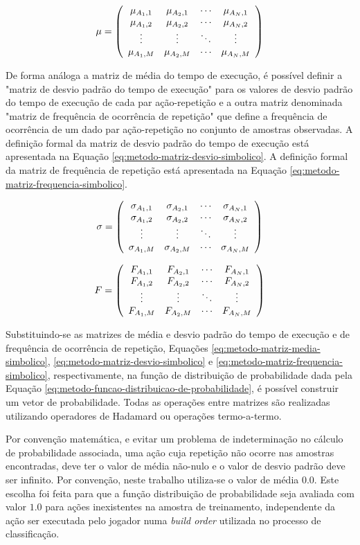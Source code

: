 \begin{equation}
	\mu =  \left(\begin{array}{cccc} {\mu}_{A_1,1} & {\mu}_{A_2,1} & \cdots & {\mu}_{A_N,1} \\ {\mu}_{A_1,2} & {\mu}_{A_2,2} & \cdots & {\mu}_{A_N,2} \\ \vdots & \vdots & \ddots & \vdots \\ {\mu}_{A_1,M} & {\mu}_{A_2,M} & \cdots & {\mu}_{A_N,M} \end{array}\right) 
	\label{eq:metodo-matriz-media-simbolico}
\end{equation}

De forma análoga a matriz de média do tempo de execução, é possível definir a "matriz de desvio padrão do tempo de execução" para os valores de desvio padrão do tempo de execução de cada par ação-repetição e a outra matriz denominada "matriz de frequência de ocorrência de repetição" que define a frequência de ocorrência de um dado par ação-repetição no conjunto de amostras observadas. A definição formal da matriz de desvio padrão do tempo de execução está apresentada na Equação \ref{eq:metodo-matriz-desvio-simbolico}. A definição formal da matriz de frequência de repetição está apresentada na Equação \ref{eq:metodo-matriz-frequencia-simbolico}.

\begin{equation}
	\sigma =  \left(\begin{array}{cccc} {\sigma}_{A_1,1} & {\sigma}_{A_2,1} & \cdots & {\sigma}_{A_N,1} \\ {\sigma}_{A_1,2} & {\sigma}_{A_2,2} & \cdots & {\sigma}_{A_N,2} \\ \vdots & \vdots & \ddots & \vdots \\ {\sigma}_{A_1,M} & {\sigma}_{A_2,M} & \cdots & {\sigma}_{A_N,M} \end{array}\right) 
	\label{eq:metodo-matriz-desvio-simbolico}
\end{equation}

\begin{equation}
	F =  \left(\begin{array}{cccc} {F}_{A_1,1} & {F}_{A_2,1} & \cdots & {F}_{A_N,1} \\ {F}_{A_1,2} & {F}_{A_2,2} & \cdots & {F}_{A_N,2} \\ \vdots & \vdots & \ddots & \vdots \\ {F}_{A_1,M} & {F}_{A_2,M} & \cdots & {F}_{A_N,M} \end{array}\right) 
	\label{eq:metodo-matriz-frequencia-simbolico}
\end{equation}


Substituindo-se as matrizes de média e desvio padrão do tempo de execução e de frequência de ocorrência de repetição, Equações \ref{eq:metodo-matriz-media-simbolico}, \ref{eq:metodo-matriz-desvio-simbolico} e \ref{eq:metodo-matriz-frequencia-simbolico}, respectivamente, na função de distribuição de probabilidade dada pela Equação \ref{eq:metodo-funcao-distribuicao-de-probabilidade}, é possível construir um vetor de probabilidade. Todas as operações entre matrizes são realizadas utilizando operadores de Hadamard \cite{matrix-analysis} ou operações termo-a-termo.

Por convenção matemática, e evitar um problema de indeterminação no cálculo de probabilidade associada, uma ação cuja repetição não ocorre nas amostras encontradas, deve ter o valor de média não-nulo e o valor de desvio padrão deve ser infinito. Por convenção, neste trabalho utiliza-se o valor de média $0.0$. Este escolha foi feita para que a função distribuição de probabilidade seja avaliada com valor $1.0$ para ações inexistentes na amostra de treinamento, independente da ação ser executada pelo jogador numa \textit{build order} utilizada no processo de classificação.

\newcommand{\RPME}[4]{
	\ensuremath{
		{#1} e^{-\frac{(#4-{#2})^2}{{{#3}}^2}}
	}
}
\newcommand{\RPMGE}[1]{
	\RPME{F_{{#1}}}{\mu_{{#1}}}{\sigma_{{#1}}}{t_{{#1}}}
}


